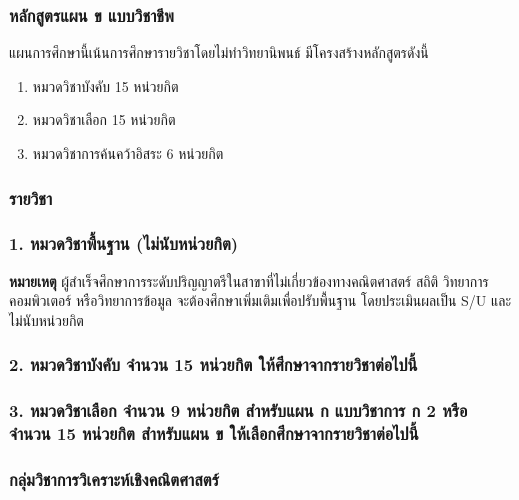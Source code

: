 \subsubsection*{หลักสูตรแผน ข แบบวิชาชีพ} 
แผนการศึกษานี้เน้นการศึกษารายวิชาโดยไม่ทำวิทยานิพนธ์ มีโครงสร้างหลักสูตรดังนี้

\begin{enumerate}
	\item หมวดวิชาบังคับ \hfill 15 หน่วยกิต
	\item หมวดวิชาเลือก \hfill 15 หน่วยกิต
	\item หมวดวิชาการค้นคว้าอิสระ \hfill 6 หน่วยกิต
\end{enumerate}

\clearpage
\subsubsection{รายวิชา}

\subsubsection*{1. หมวดวิชาพื้นฐาน (ไม่นับหน่วยกิต)}



\par\noindent\textbf{หมายเหตุ} ผู้สำเร็จศึกษาการระดับปริญญาตรีในสาขาที่ไม่เกี่ยวข้องทางคณิตศาสตร์ สถิติ วิทยาการคอมพิวเตอร์ หรือวิทยาการข้อมูล จะต้องศึกษาเพิ่มเติมเพื่อปรับพื้นฐาน โดยประเมินผลเป็น S/U และไม่นับหน่วยกิต


\subsubsection*{2. หมวดวิชาบังคับ จำนวน 15 หน่วยกิต ให้ศึกษาจากรายวิชาต่อไปนี้}



\subsubsection*{3. หมวดวิชาเลือก จำนวน 9 หน่วยกิต สำหรับแผน ก แบบวิชาการ ก 2 หรือ จำนวน 15 หน่วยกิต สำหรับแผน ข ให้เลือกศึกษาจากรายวิชาต่อไปนี้}

\subsubsection*{กลุ่มวิชาการวิเคราะห์เชิงคณิตศาสตร์}



